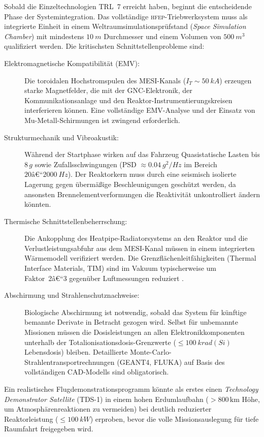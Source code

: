 ﻿\documentclass[a4paper,12pt,twoside]{article}
\theoremstyle{plain}
\theoremstyle{definition}
\theoremstyle{remark}
\newcommand{\HFEP}{\textsc{hfep}}
\begin{document}
	Sobald die Einzeltechnologien TRL~7 erreicht haben, beginnt die entscheidende Phase
	der Systemintegration. Das vollständige \HFEP-Triebwerksystem muss als integrierte
	Einheit in einem Weltraumsimulations\-prüfstand (\emph{Space Simulation Chamber})
	mit mindestens $\SI{10}{m}$ Durchmesser und einem Volumen von $\SI{500}{m^3}$
	qualifiziert werden. Die kritischsten Schnittstellenprobleme sind:

	\begin{description}
		\item[Elektro\-magnetische Kompatibilität (EMV):]
		Die toroidalen Hochstromspulen des MESI-Kanals ($I_T \sim\SI{50}{kA}$)
		erzeugen starke Magnetfelder, die mit der GNC-Elektronik, der Kommunikationsanlage
		und den Reaktor-Instrumentierungskreisen interferieren können. Eine vollständige
		EMV-Analyse und der Einsatz von Mu-Metall-Schirmungen ist zwingend erforderlich.

		\item[Strukturmechanik und Vibroakustik:]
		Während der Startphase wirken auf das Fahrzeug Quasistatische Lasten bis
		$8\,g$ sowie Zufallsschwingungen (PSD $\approx\SI{0.04}{g^2/Hz}$ im Bereich
		$20\text{â€“}\SI{2000}{Hz}$). Der Reaktorkern muss durch eine seismisch isolierte
		Lagerung gegen über\-mäßige Beschleunigungen geschützt werden, da ansonsten
		Brennelementverformungen die Reaktivität unkontrolliert ändern könnten.

		\item[Thermische Schnittstellenbeherrschung:]
		Die Ankopplung des Heatpipe-Radiatorsys\-tems an den Reaktor und die
		Verlustleistungsabfuhr aus dem MESI-Kanal müssen in einem integrierten
		Wärmemodell verifiziert werden. Die Grenzflächenleitfähigkeiten (Thermal
		Interface Materials, TIM) sind im Vakuum typischerweise um Faktor~2â€“3
		gegenüber Luftmessungen reduziert \cite{gilmore2002}.

		\item[Abschirmung und Strahlenschutznachweise:]
		Biologische Abschirmung ist notwendig, sobald das System für künftige
		bemannte Derivate in Betracht gezogen wird. Selbst für unbemannte Missionen
		müssen die Dosisleistungen an allen Elektronikkomponenten unterhalb der
		Totalionisationsdosis-Grenzwerte ($\leq\SI{100}{krad(Si)}$ Lebensdosis)
		bleiben. Detaillierte Monte-Carlo-Strahlentransportrechnungen (GEANT4,
		FLUKA) auf Basis des vollständigen CAD-Modells sind obligatorisch.
	\end{description}

	Ein realistisches Flugdemonstrationsprogramm könnte als erstes einen
	\emph{Technology Demonstrator Satellite} (TDS-1) in einem hohen Erdumlaufbahn
	($>800\,\mathrm{km}$ Höhe, um Atmosphärenreaktionen zu vermeiden) bei deutlich
	reduzierter Reaktorleistung ($\leq\SI{100}{kW}$) erproben, bevor die volle
	Missionsauslegung für tiefe Raumfahrt freigegeben wird.
\end{document}
